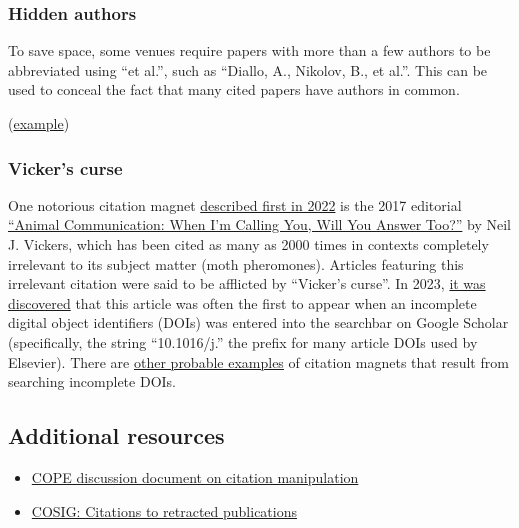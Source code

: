 \documentclass[letterpaper, 12pt]{article}
\begin{document}
\subsubsection*{Hidden authors}

To save space, some venues require papers with more than a few authors to be abbreviated using ``et al.'',
such as ``Diallo, A., Nikolov, B., et al.''.
This can be used to conceal the fact that many cited papers have authors in common.

(\href{https://pubpeer.com/publications/00DCF18F504B8C420F12A70B5FB30C}{example})

\subsubsection*{Vicker's curse}

One notorious citation magnet \href{https://forbetterscience.com/2022/10/31/when-im-citing-you-will-you-answer-too/}{described first in 2022} is the 2017 editorial \href{https://doi.org/10.1016/j.cub.2017.05.064}{``Animal Communication: When I’m Calling You, Will You Answer Too?''} by Neil J. Vickers, which has been cited as many as 2000 times in contexts completely irrelevant to its subject matter (moth pheromones). Articles featuring this irrelevant citation were said to be afflicted by ``Vicker's curse''. In 2023, \href{https://forbetterscience.com/2023/07/31/the-vickers-curse-secret-revealed/}{it was discovered} that this article was often the first to appear when an incomplete digital object identifiers (DOIs) was entered into the searchbar on Google Scholar (specifically, the string ``10.1016/j.'' the prefix for many article DOIs used by Elsevier). There are \href{https://pubpeer.com/publications/4BB5BE5F56EFEBC3A67D89D1EB5501}{other probable examples} of citation magnets that result from searching incomplete DOIs. 

\subsection*{Additional resources}

\begin{itemize}
    \setlength\itemsep{-0.5em}
    \item \href{https://doi.org/10.24318/cope.2019.3.1}{COPE discussion document on citation manipulation}
    \item \href{https://osf.io/9q3as}{COSIG: Citations to retracted publications}
\end{itemize}
\end{document}

